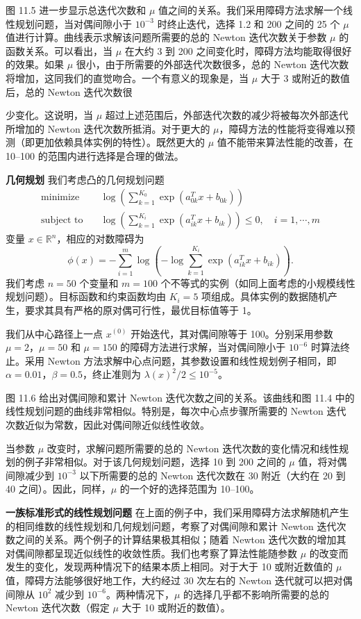 \documentclass[UTF8,12pt,a4paper,fontset=fandol]{ctexart}
\begin{document}
图 11.5 进一步显示总迭代次数和 $\mu$ 值之间的关系。我们采用障碍方法求解一个线性规划问题，当对偶间隙小于 $10^{-3}$ 时终止迭代，选择 1.2 和 200 之间的 25 个 $\mu$ 值进行计算。曲线表示求解该问题所需要的总的 Newton 迭代次数关于参数 $\mu$ 的函数关系。可以看出，当 $\mu$ 在大约 3 到 200 之间变化时，障碍方法均能取得很好的效果。如果 $\mu$ 很小，由于所需要的外部迭代次数很多，总的 Newton 迭代次数将增加，这同我们的直觉吻合。一个有意义的现象是，当 $\mu$ 大于 3 或附近的数值后，总的 Newton 迭代次数很

少变化。这说明，当 $\mu$ 超过上述范围后，外部迭代次数的减少将被每次外部迭代所增加的 Newton 迭代次数所抵消。对于更大的 $\mu$，障碍方法的性能将变得难以预测（即更加依赖具体实例的特性）。既然更大的 $\mu$ 值不能带来算法性能的改善，在 10--100 的范围内进行选择是合理的做法。

\noindent\textbf{几何规划}\quad
我们考虑凸的几何规划问题
\[
\begin{aligned}
\text{minimize}\quad & \log\left(\sum_{k=1}^{K_0}\exp(a_{0k}^Tx+b_{0k})\right)\\
\text{subject to}\quad & \log\left(\sum_{k=1}^{K_i}\exp(a_{ik}^Tx+b_{ik})\right)\leq 0,\quad i=1,\cdots,m
\end{aligned}
\]
变量 $x\in\mathbb{R}^n$，相应的对数障碍为
\[
\phi(x)=-\sum_{i=1}^m\log\left(-\log\sum_{k=1}^{K_i}\exp(a_{ik}^Tx+b_{ik})\right).
\]
我们考虑 $n=50$ 个变量和 $m=100$ 个不等式的实例（如同上面考虑的小规模线性规划问题）。目标函数和约束函数均由 $K_i=5$ 项组成。具体实例的数据随机产生，要求其具有严格的原对偶可行性，最优目标值等于 1。

我们从中心路径上一点 $x^{(0)}$ 开始迭代，其对偶间隙等于 100。分别采用参数 $\mu=2$，$\mu=50$ 和 $\mu=150$ 的障碍方法进行求解，当对偶间隙小于 $10^{-6}$ 时算法终止。采用 Newton 方法求解中心点问题，其参数设置和线性规划例子相同，即 $\alpha=0.01$，$\beta=0.5$，终止准则为 $\lambda(x)^2/2\leq 10^{-5}$。

图 11.6 给出对偶间隙和累计 Newton 迭代次数之间的关系。该曲线和图 11.4 中的
线性规划问题的曲线非常相似。特别是，每次中心点步骤所需要的 Newton 迭代次数近似为常数，因此对偶间隙近似线性收敛。

当参数 $\mu$ 改变时，求解问题所需要的总的 Newton 迭代次数的变化情况和线性规划的例子非常相似。对于该几何规划问题，选择 10 到 200 之间的 $\mu$ 值，将对偶间隙减少到 $10^{-3}$ 以下所需要的总的 Newton 迭代次数在 30 附近（大约在 20 到 40 之间）。因此，同样，$\mu$ 的一个好的选择范围为 10--100。

\noindent\textbf{一族标准形式的线性规划问题}\quad
在上面的例子中，我们采用障碍方法求解随机产生的相同维数的线性规划和几何规划问题，考察了对偶间隙和累计 Newton 迭代次数之间的关系。两个例子的计算结果极其相似；随着 Newton 迭代次数的增加其对偶间隙都呈现近似线性的收敛性质。我们也考察了算法性能随参数 $\mu$ 的改变而发生的变化，发现两种情况下的结果本质上相同。对于大于 10 或附近数值的 $\mu$ 值，障碍方法能够很好地工作，大约经过 30 次左右的 Newton 迭代就可以把对偶间隙从 $10^2$ 减少到 $10^{-6}$。两种情况下，$\mu$ 的选择几乎都不影响所需要的总的 Newton 迭代次数（假定 $\mu$ 大于 10 或附近的数值）。
\end{document}
